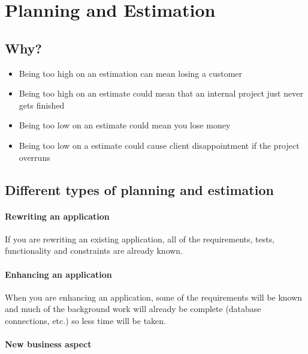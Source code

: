 \section{Planning and Estimation}\label{sec:planning_and_estimation}

\subsection{Why?}\label{sub:why_}

\begin{itemize}
    \item Being too high on an estimation can mean losing a customer
    \item Being too high on an estimate could mean that an internal project just never gets finished
    \item Being too low on an estimate could mean you lose money
    \item Being too low on a estimate could cause client disappointment if the project overruns
\end{itemize}

\subsection{Different types of planning and estimation}\label{sub:different_types_of_planning_and_estimation}

\paragraph{Rewriting an application}\label{par:rewriting_an_application}

If you are rewriting an existing application, all of the requirements, tests, functionality and constraints are already known.

\paragraph{Enhancing an application}\label{par:enhancing_an_application}

When you are enhancing an application, some of the requirements will be known and much of the background work will already be complete (database connections, etc.) so less time will be taken.

\paragraph{New business aspect}\label{par:new_business_aspect}


